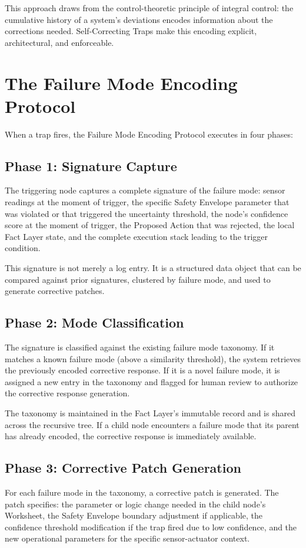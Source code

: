 \documentclass[12pt]{article}
\begin{document}
This approach draws from the control-theoretic principle of integral control: the cumulative history of a system's deviations encodes information about the corrections needed. Self-Correcting Traps make this encoding explicit, architectural, and enforceable.

\section{The Failure Mode Encoding Protocol}
When a trap fires, the Failure Mode Encoding Protocol executes in four phases:

\subsection{Phase 1: Signature Capture}
The triggering node captures a complete signature of the failure mode: sensor readings at the moment of trigger, the specific Safety Envelope parameter that was violated or that triggered the uncertainty threshold, the node's confidence score at the moment of trigger, the Proposed Action that was rejected, the local Fact Layer state, and the complete execution stack leading to the trigger condition.

This signature is not merely a log entry. It is a structured data object that can be compared against prior signatures, clustered by failure mode, and used to generate corrective patches.

\subsection{Phase 2: Mode Classification}
The signature is classified against the existing failure mode taxonomy. If it matches a known failure mode (above a similarity threshold), the system retrieves the previously encoded corrective response. If it is a novel failure mode, it is assigned a new entry in the taxonomy and flagged for human review to authorize the corrective response generation.

The taxonomy is maintained in the Fact Layer's immutable record and is shared across the recursive tree. If a child node encounters a failure mode that its parent has already encoded, the corrective response is immediately available.

\subsection{Phase 3: Corrective Patch Generation}
For each failure mode in the taxonomy, a corrective patch is generated. The patch specifies: the parameter or logic change needed in the child node's Worksheet, the Safety Envelope boundary adjustment if applicable, the confidence threshold modification if the trap fired due to low confidence, and the new operational parameters for the specific sensor-actuator context.
\end{document}

